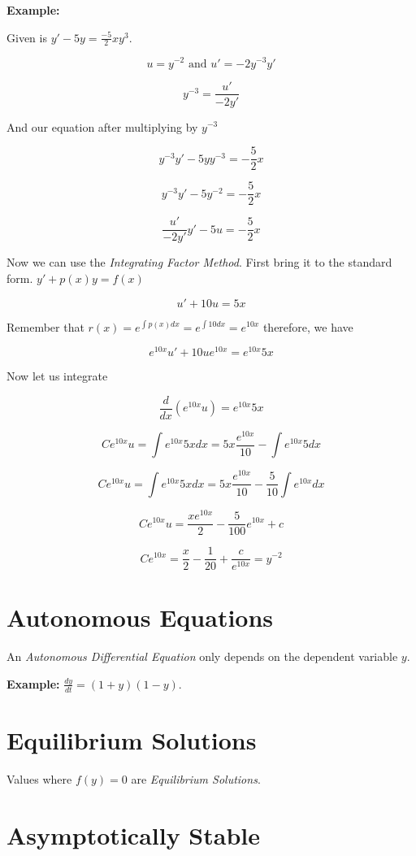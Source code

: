 \textbf{Example: }

Given is \(y' -5y = \frac{-5}{2}xy^3\).

\[
    u = y^{-2}  \text{ and } u' = -2y^{-3}y'
\]

\[
    y^{-3} = \frac{u'}{-2y'}
\]

And our equation after multiplying by \(y^{-3}\)

\[
    y^{-3}y' - 5yy^{-3} = -\frac{5}{2}x
\]

\[
    y^{-3}y' - 5y^{-2} = -\frac{5}{2}x
\]

\[
    \frac{u'}{-2y'}y' - 5u = -\frac{5}{2}x
\]

Now we can use the \emph{Integrating Factor Method}. First bring it to the standard form.
\(y' + p(x)y = f(x)\)

\[
    u' + 10u = 5x
\]

Remember that \(r(x) = e^{\int p(x)dx} = e^{\int 10 dx} = e^{10x}\) therefore, we have

\[
    e^{10x}u' + 10ue^{10x} = e^{10x}5x
\]

Now let us integrate

\[
    \frac{d}{dx} \left(e^{10x}u\right) = e^{10x}5x
\]

\[
    Ce^{10x}u = \int e^{10x} 5x dx = 5x \frac{e^{10x}}{10} - \int e^{10x}5dx
\]

\[
    Ce^{10x}u = \int e^{10x} 5x dx = 5x \frac{e^{10x}}{10} - \frac{5}{10}\int e^{10x}dx
\]

\[
    Ce^{10x}u = \frac{xe^{10x}}{2} - \frac{5}{100} e^{10x} + c
\]

\[
    Ce^{10x} = \frac{x}{2} - \frac{1}{20} + \frac{c}{e^{10x}} = y^{-2}
\]

\section{Autonomous Equations}

An \emph{Autonomous Differential Equation} only depends on the dependent
variable \(y\).

\textbf{ Example: } \(\frac{dy}{dt} = (1 + y)(1 -y)\).

\section{Equilibrium Solutions}

Values where \(f(y) = 0\) are \emph{Equilibrium Solutions}.

\section{Asymptotically Stable}

